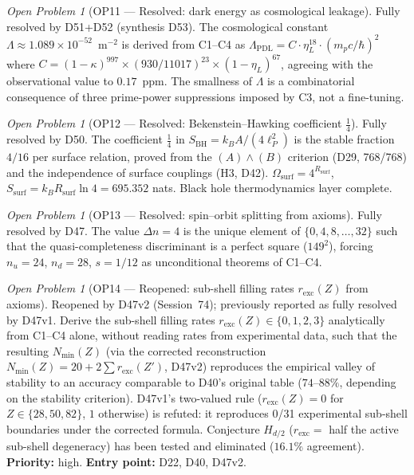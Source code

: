 \documentclass[11pt,a4paper]{article}
\theoremstyle{plain}
\theoremstyle{definition}
\theoremstyle{remark}
\newtheorem{openproblem}[theorem]{Open Problem}
\newcommand{\Rsurf}{R_{\mathrm{surf}}}
\newcommand{\SBH}{S_{\mathrm{BH}}}
\begin{document}
\begin{openproblem}[OP11 --- Resolved: dark energy as cosmological leakage]
\label{op:darkenergy}
\textcolor{proofblue}{Fully resolved by D51+D52 (synthesis D53).} The cosmological constant $\Lambda \approx 1.089 \times 10^{-52}$~m$^{-2}$ is derived from C1--C4 as $\Lambda_{\mathrm{PDL}} = C \cdot \eta_L^{18} \cdot (m_p c/\hbar)^2$ where $C = (1-\kappa)^{997} \times (930/11017)^{23} \times (1-\eta_L)^{67}$, agreeing with the observational value to $0.17$~ppm. The smallness of $\Lambda$ is a combinatorial consequence of three prime-power suppressions imposed by C3, not a fine-tuning.
\end{openproblem}

\begin{openproblem}[OP12 --- Resolved: Bekenstein--Hawking coefficient $\tfrac{1}{4}$]
\label{op:BHcoeff}
\textcolor{proofblue}{Fully resolved by D50.} The coefficient $\tfrac{1}{4}$ in $\SBH = k_B A/(4\ell_P^2)$ is the stable fraction $4/16$ per surface relation, proved from the $(A)\wedge(B)$ criterion (D29, 768/768) and the independence of surface couplings (H3, D42). $\Omega_{\mathrm{surf}} = 4^{\Rsurf}$, $S_{\mathrm{surf}} = k_B\Rsurf\ln 4 = 695.352$ nats. Black hole thermodynamics layer complete.
\end{openproblem}

\begin{openproblem}[OP13 --- Resolved: spin--orbit splitting from axioms]
\label{op:spinorbit}
\textcolor{proofblue}{Fully resolved by D47.} The value $\Delta n = 4$ is the unique element of $\{0,4,8,\ldots,32\}$ such that the quasi-completeness discriminant is a perfect square ($149^2$), forcing $n_u=24$, $n_d=28$, $s=1/12$ as unconditional theorems of C1--C4.
\end{openproblem}

\begin{openproblem}[OP14 --- Reopened: sub-shell filling rates $r_{\mathrm{exc}}(Z)$ from axioms]
\label{op:filling}
\textcolor{negativered}{Reopened by D47v2 (Session~74); previously reported as fully resolved by D47v1.} Derive the sub-shell filling rates $r_{\mathrm{exc}}(Z)\in\{0,1,2,3\}$ analytically from C1--C4 alone, without reading rates from experimental data, such that the resulting $N_{\min}(Z)$ (via the corrected reconstruction $N_{\min}(Z)=20+2\sum r_{\mathrm{exc}}(Z')$, D47v2) reproduces the empirical valley of stability to an accuracy comparable to D40's original table ($74$--$88\%$, depending on the stability criterion). D47v1's two-valued rule ($r_{\mathrm{exc}}(Z)=0$ for $Z\in\{28,50,82\}$, $1$ otherwise) is refuted: it reproduces 0/31 experimental sub-shell boundaries under the corrected formula. Conjecture $H_{d/2}$ ($r_{\mathrm{exc}}=$ half the active sub-shell degeneracy) has been tested and eliminated ($16.1\%$ agreement). \textbf{Priority:} high. \textbf{Entry point:} D22, D40, D47v2.
\end{openproblem}
\end{document}
